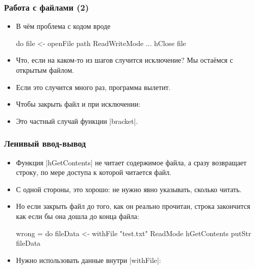 \documentclass[11pt]{beamer}
\begin{document}
\begin{frame}[fragile]
  \frametitle{Работа с файлами (2)}
  \begin{itemize}
    \item В чём проблема с кодом вроде
          \begin{haskell}
            do
              file <- openFile path ReadWriteMode
              ...
              hClose file
          \end{haskell}
          \pause
    \item Что, если на каком-то из шагов случится исключение? Мы остаёмся с открытым файлом.
    \item Если это случится много раз, программа вылетит.
          \pause
    \item Чтобы закрыть файл и при исключении:
    \item Это частный случай функции \haskinline|bracket|.
  \end{itemize}
\end{frame}

\begin{frame}[fragile]
  \frametitle{Ленивый ввод-вывод}
  \begin{itemize}
    \item Функция \haskinline|hGetContents| не читает содержимое файла, а сразу возвращает строку, по мере доступа к которой читается файл.
    \item С одной стороны, это хорошо: не нужно явно указывать, сколько читать.
    \item Но если закрыть файл до того, как он реально прочитан, строка закончится как если бы она дошла до конца файла:
          \begin{haskellsmall}
            wrong = do
            fileData <- withFile "test.txt" ReadMode hGetContents
            putStr fileData
          \end{haskellsmall}
    \item Нужно использовать данные внутри \haskinline|withFile|:
  \end{itemize}
\end{frame}
\end{document}
